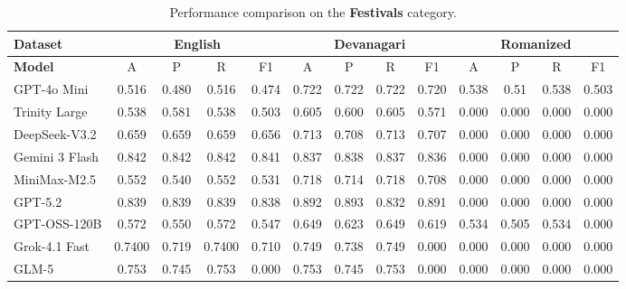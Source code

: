 \documentclass[10pt, a4paper]{article}
\begin{document}
\begin{table}[t]
\centering
\footnotesize
\setlength{\tabcolsep}{4pt}
\renewcommand{\arraystretch}{1.1}

\begin{tabular}{|>{\raggedright\arraybackslash}p{3cm}|cccc|cccc|cccc|}
\hline
\textbf{Dataset}
& \multicolumn{4}{c|}{\textbf{English}}
& \multicolumn{4}{c|}{\textbf{Devanagari}}
& \multicolumn{4}{c|}{\textbf{Romanized}} \\
\hline
\textbf{Model}
& A & P & R & F1 & A & P & R & F1 & A & P & R & F1 \\
\hline
GPT-4o Mini & 0.516& 0.480& 0.516& 0.474& 0.722& 0.722& 0.722& 0.720& 0.538& 0.51& 0.538& 0.503\\
\hline
Trinity Large & 0.538& 0.581& 0.538& 0.503& 0.605& 0.600& 0.605& 0.571& 0.000 & 0.000 & 0.000 & 0.000 \\
\hline
DeepSeek-V3.2 & 0.659& 0.659& 0.659& 0.656& 0.713& 0.708& 0.713& 0.707& 0.000 & 0.000 & 0.000 & 0.000 \\
\hline
Gemini 3 Flash & 0.842& 0.842& 0.842& 0.841& 0.837& 0.838& 0.837& 0.836& 0.000 & 0.000 & 0.000 & 0.000 \\
\hline
MiniMax-M2.5 & 0.552& 0.540& 0.552& 0.531& 0.718& 0.714& 0.718& 0.708& 0.000 & 0.000 & 0.000 & 0.000 \\
\hline
GPT-5.2 & 0.839& 0.839& 0.839& 0.838& 0.892& 0.893& 0.832& 0.891& 0.000 & 0.000 & 0.000 & 0.000 \\
\hline
GPT-OSS-120B & 0.572& 0.550& 0.572& 0.547& 0.649& 0.623& 0.649& 0.619& 0.534& 0.505& 0.534& 0.000 \\
\hline
Grok-4.1 Fast & 0.7400& 0.719& 0.7400& 0.710& 0.749& 0.738& 0.749& 0.000 & 0.000 & 0.000 & 0.000 & 0.000 \\
\hline
GLM-5 & 0.753& 0.745& 0.753& 0.000 & 0.753& 0.745& 0.753& 0.000 & 0.000 & 0.000 & 0.000 & 0.000 \\
\hline
\end{tabular}
\caption{Performance comparison on the \textbf{Festivals} category.}
\label{tab:festivals_results}
\end{table}
\end{document}
